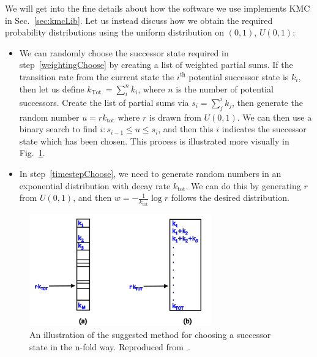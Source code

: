 We will get into the fine details about how the software we use implements KMC in Sec.~\ref{sec:kmcLib}.
Let us instead discuss how we obtain the required probability distributions using the uniform distribution
on $(0, 1)$, $U(0, 1)$:
\begin{itemize}
 \item We can randomly choose the successor state required in step~\ref{weightingChoose} by
 creating a list of weighted partial sums. If the transition rate from the current state the $i^\mathrm{th}$
 potential successor state is $k_i$, then let us define $k_\mathrm{Tot.} = \sum_{i}^n k_i$, 
 where $n$ is the
 number of potential successors. Create the list of partial sums via $s_i = \sum_j^i k_j$, then generate
 the random number $u = r k_\mathrm{tot}$ where $r$ is drawn from $U(0, 1)$. We can then use a binary
 search to find $i: s_{i-1} \le u \le s_i$, and then this $i$ indicates the successor state which has been
 chosen. This process is illustrated more visually in Fig.~\ref{fig:weightChoice}.
 \item In step~\ref{timestepChoose}, we need to generate random numbers in an exponential distribution
 with decay rate $k_\mathrm{tot}$. We can do this by generating $r$ from $U(0, 1)$, and then 
 $w = -\frac{1}{k_\mathrm{tot}} \log{r}$
 follows the desired distribution.
\end{itemize}
\begin{figure}[h!]
 \caption[Illustration of the method for choosing successor states in the n-fold way.]{\label{fig:weightChoice} 
 An illustration of the suggested method for choosing a successor state in the n-fold way. Reproduced
 from~\cite{voterKMC}.
 }
  \begin{center}
 \includegraphics[width=0.7\textwidth]{numerics/images/nFoldWayRates}
  \end{center}
\end{figure}

